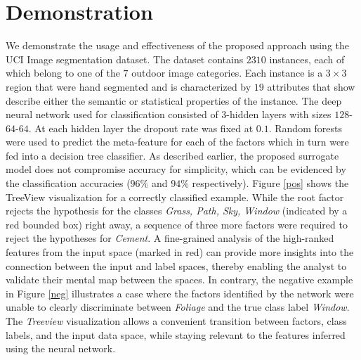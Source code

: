\documentclass[final]{article}
\begin{document}
\section{Demonstration}
We demonstrate the usage and effectiveness of the proposed approach using the UCI Image segmentation dataset. The dataset contains $2310$ instances, each of which belong to one of the $7$ outdoor image categories. Each instance is a $3\times3$ region that were hand segmented and is characterized by $19$ attributes that show describe either the semantic or statistical properties of the instance. The deep neural network used for classification consisted of $3$-hidden layers with sizes $128$-$64$-$64$. At each hidden layer the dropout rate was fixed at $0.1$. Random forests were used to predict the meta-feature for each of the factors which in turn were fed into a decision tree classifier. As described earlier, the proposed surrogate model does not compromise accuracy for simplicity, which can be evidenced by the classification accuracies ($96\%$ and $94\%$ respectively). Figure \ref{pos} shows the TreeView visualization for a correctly classified example. While the root factor rejects the hypothesis for the classes \textit{Grass, Path, Sky, Window} (indicated by a red bounded box) right away, a sequence of three more factors were required to reject the hypotheses for \textit{Cement}. A fine-grained analysis of the high-ranked features from the input space (marked in red) can provide more insights into the connection between the input and label spaces, thereby enabling the analyst to validate their mental map between the spaces. In contrary, the negative example in Figure \ref{neg} illustrates a case where the factors identified by the network were unable to clearly discriminate between \textit{Foliage} and the true class label \textit{Window}. The \textit{Treeview} visualization allows a convenient transition between factors, class labels, and the input data space, while staying relevant to the features inferred using the neural network.




\end{document}
